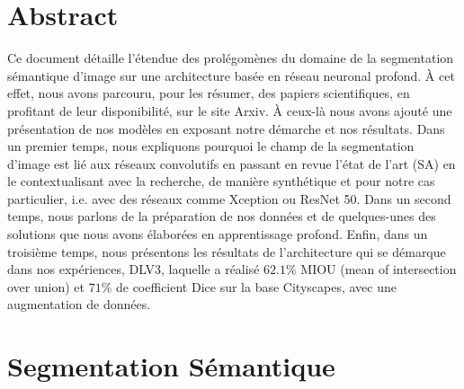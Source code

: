 \documentclass[
10pt,
a4paper, 
oneside, 
headinclude,footinclude, 
]{scrartcl}
\title{\normalfont\spacedallcaps{Segmentation sémantique d’image}}
\author{\spacedlowsmallcaps{Romain BOYRIE}}
\date{$17$ Février $2022$}
\begin{document}
\renewcommand{\sectionmark}[1]{\markright{\spacedlowsmallcaps{#1}}} 
\lehead{\mbox{\llap{\small\thepage\kern1em\color{halfgray} \vline}\color{halfgray}\hspace{0.5em}\rightmark\hfil}} 

\pagestyle{scrheadings} 


\maketitle 

\setcounter{tocdepth}{2} 

\tableofcontents 

\listoffigures

\listoftables 

\newpage
\section*{Abstract} 

Ce document détaille l’étendue des prolégomènes du domaine de la segmentation sémantique d’image sur une architecture basée en réseau neuronal profond. À cet effet, nous avons parcouru, pour les résumer, des papiers scientifiques, en profitant de leur disponibilité, sur le site Arxiv. À ceux-là nous avons ajouté une présentation de nos modèles en exposant notre démarche et nos résultats. Dans un premier temps, nous expliquons pourquoi le champ de la segmentation d’image est lié aux réseaux convolutifs en passant en revue l’état de l’art (\gls{SA}) en le contextualisant avec la recherche, de manière synthétique et pour notre cas particulier, i.e. avec des réseaux comme Xception ou ResNet 50. Dans un second temps, nous parlons de la préparation de nos données et de quelques-unes des solutions que nous avons élaborées en apprentissage profond. Enfin, dans un troisième temps, nous présentons les résultats de l’architecture qui se démarque dans nos expériences, \gls{DLV3}, laquelle a réalisé $62.1\%$ \gls{MIOU} (mean of intersection over union) et $71\%$ de coefficient \gls{Dice} sur la base Cityscapes, avec une augmentation de données.



\section{Segmentation Sémantique}
\end{document}
